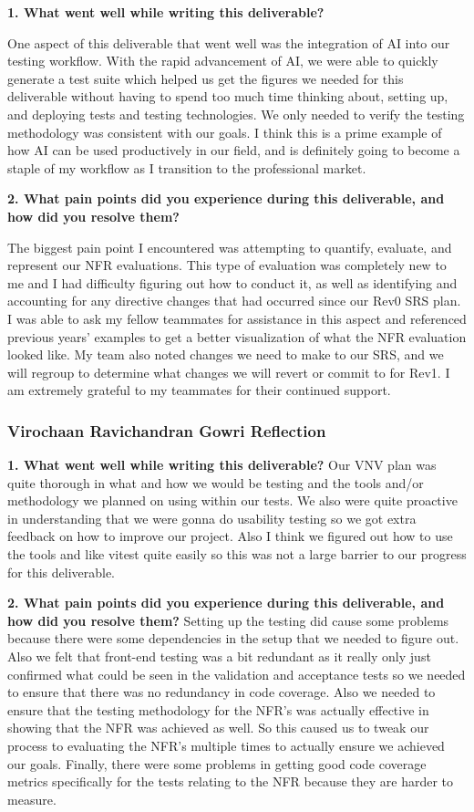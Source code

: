 \documentclass[12pt, titlepage]{article}
\begin{document}
\textbf{1. What went well while writing this deliverable?}

One aspect of this deliverable that went well was the integration of AI
into our testing workflow. With the rapid advancement of AI, we were able
to quickly generate a test suite which helped us get the figures we needed
for this deliverable without having to spend too much time thinking about,
setting up, and deploying tests and testing technologies. We only needed to
verify the testing methodology was consistent with our goals. I think this is
a prime example of how AI can be used productively in our field, and is
definitely going to become a staple of my workflow as I transition to the
professional market.

\textbf{2. What pain points did you experience during this deliverable,
and how did you resolve them?}

The biggest pain point I encountered was attempting to quantify, evaluate, and
represent our NFR evaluations. This type of evaluation was completely new to me
and I had difficulty figuring out how to conduct it, as well as identifying and
accounting for any directive changes that had occurred since our Rev0 SRS plan.
I was able to ask my fellow teammates for assistance in this aspect and
referenced previous years' examples to get a better visualization of what the
NFR evaluation looked like. My team also noted changes we need to make to our
SRS, and we will regroup to determine what changes we will revert or commit to
for Rev1. I am extremely grateful to my teammates for their continued support.

\subsubsection*{Virochaan Ravichandran Gowri Reflection}

\textbf{1. What went well while writing this deliverable?}
Our VNV plan was quite thorough in what and how we would be testing and the tools and/or methodology we planned on using within our tests. We also were quite proactive in understanding that we were gonna do usability testing so we got extra feedback on how to improve our project. Also I think we figured out how to use the tools and like vitest quite easily so this was not a large barrier to our progress for this deliverable.

\textbf{2. What pain points did you experience during this deliverable,
and how did you resolve them?}
Setting up the testing did cause some problems because there were some dependencies in the setup that we needed to figure out. Also we felt that front-end testing was a bit redundant as it really only just confirmed what could be seen in the validation and acceptance tests so we needed to ensure that there was no redundancy in code coverage. Also we needed to ensure that the testing methodology for the NFR's was actually effective in showing that the NFR was achieved as well. So this caused us to tweak our process to evaluating the NFR's multiple times to actually ensure we achieved our goals. Finally, there were some problems in getting good code coverage metrics specifically for the tests relating to the NFR because they are harder to measure.
\end{document}
